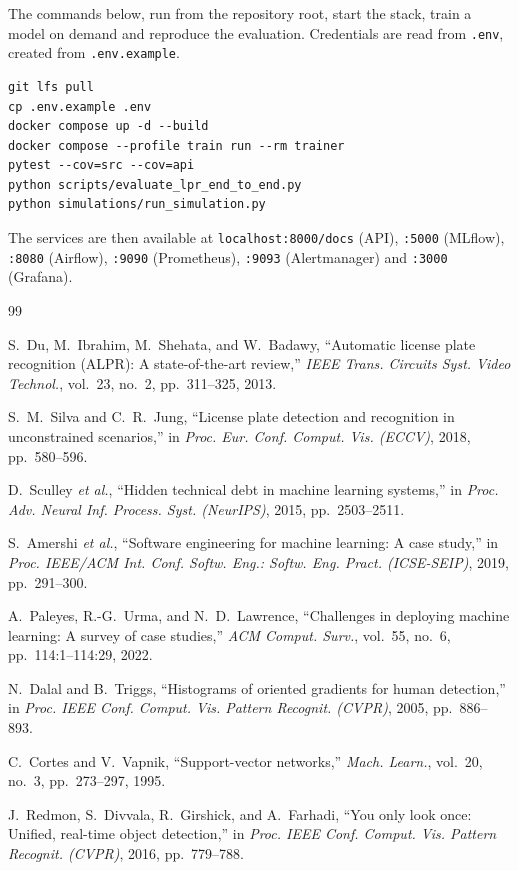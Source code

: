 \documentclass[conference]{IEEEtran}
\newcommand{\code}[1]{\texttt{#1}}
\begin{document}
The commands below, run from the repository root, start the stack, train a model
on demand and reproduce the evaluation. Credentials are read from \code{.env},
created from \code{.env.example}.
{\footnotesize
\begin{verbatim}
git lfs pull
cp .env.example .env
docker compose up -d --build
docker compose --profile train run --rm trainer
pytest --cov=src --cov=api
python scripts/evaluate_lpr_end_to_end.py
python simulations/run_simulation.py
\end{verbatim}
}
\noindent The services are then available at \code{localhost:8000/docs} (API),
\code{:5000} (MLflow), \code{:8080} (Airflow), \code{:9090} (Prometheus),
\code{:9093} (Alertmanager) and \code{:3000} (Grafana).

\begin{thebibliography}{99}

S.~Du, M.~Ibrahim, M.~Shehata, and W.~Badawy, ``Automatic license plate
recognition (ALPR): A state-of-the-art review,'' \emph{IEEE Trans. Circuits Syst.
Video Technol.}, vol.~23, no.~2, pp.~311--325, 2013.

S.~M.~Silva and C.~R.~Jung, ``License plate detection and recognition in
unconstrained scenarios,'' in \emph{Proc. Eur. Conf. Comput. Vis. (ECCV)}, 2018,
pp.~580--596.

D.~Sculley \emph{et al.}, ``Hidden technical debt in machine learning systems,''
in \emph{Proc. Adv. Neural Inf. Process. Syst. (NeurIPS)}, 2015, pp.~2503--2511.

S.~Amershi \emph{et al.}, ``Software engineering for machine learning: A case
study,'' in \emph{Proc. IEEE/ACM Int. Conf. Softw. Eng.: Softw. Eng. Pract.
(ICSE-SEIP)}, 2019, pp.~291--300.

A.~Paleyes, R.-G.~Urma, and N.~D.~Lawrence, ``Challenges in deploying machine
learning: A survey of case studies,'' \emph{ACM Comput. Surv.}, vol.~55, no.~6,
pp.~114:1--114:29, 2022.

N.~Dalal and B.~Triggs, ``Histograms of oriented gradients for human detection,''
in \emph{Proc. IEEE Conf. Comput. Vis. Pattern Recognit. (CVPR)}, 2005,
pp.~886--893.

C.~Cortes and V.~Vapnik, ``Support-vector networks,'' \emph{Mach. Learn.},
vol.~20, no.~3, pp.~273--297, 1995.

J.~Redmon, S.~Divvala, R.~Girshick, and A.~Farhadi, ``You only look once:
Unified, real-time object detection,'' in \emph{Proc. IEEE Conf. Comput. Vis.
Pattern Recognit. (CVPR)}, 2016, pp.~779--788.


\end{thebibliography}
\end{document}
